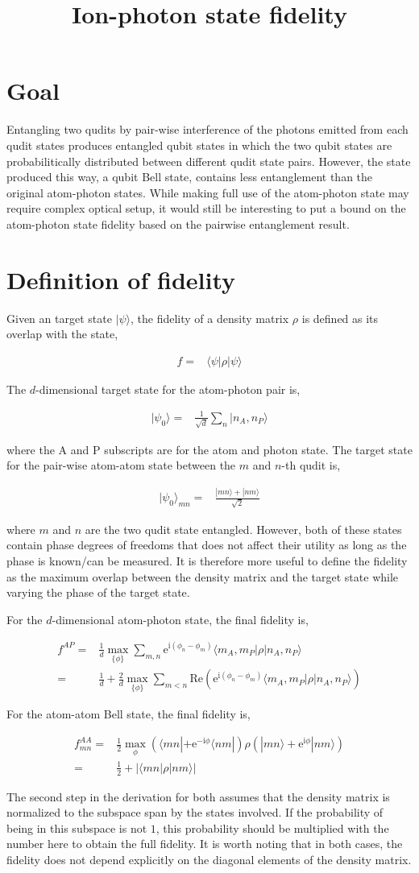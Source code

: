 \documentclass[10pt,fleqn]{article}
\title{Ion-photon state fidelity}
\newcommand{\ue}{\mathrm{e}}
\newcommand{\ui}{\mathrm{i}}
\newcommand{\eqar}[1]
{
  \begin{align}
    #1
  \end{align}
}
\newcommand{\paren}[1]{{\left({#1}\right)}}
\newcommand{\abs}[1]{{\left|{#1}\right|}}
\begin{document}
\maketitle

\section{Goal}

Entangling two qudits by pair-wise interference of the photons emitted from each qudit states produces entangled qubit states in which the two qubit states are probabilitically distributed between different qudit state pairs.
However, the state produced this way, a qubit Bell state, contains less entanglement than the original atom-photon states.
While making full use of the atom-photon state may require complex optical setup, it would still be interesting to put a bound on the atom-photon state fidelity based on the pairwise entanglement result.

\section{Definition of fidelity}
Given an target state $|\psi\rangle$, the fidelity of a density matrix $\rho$ is defined as its overlap with the state,
\eqar{
  f=&\langle\psi|\rho|\psi\rangle
}

The $d$-dimensional target state for the atom-photon pair is,
\eqar{
  |\psi_0\rangle=&\frac{1}{\sqrt{d}}\sum_{n}|n_A,n_P\rangle
}
where the A and P subscripts are for the atom and photon state. The target state for the pair-wise atom-atom state between the $m$ and $n$-th qudit is,
\eqar{
  |\psi_0\rangle_{mn}=&\frac{|mn\rangle+|nm\rangle}{\sqrt{2}}
}
where $m$ and $n$ are the two qudit state entangled.
However, both of these states contain phase degrees of freedoms that does not affect their utility as long as the phase is known/can be measured.
It is therefore more useful to define the fidelity as the maximum overlap between the density matrix and the target state while varying the phase of the target state.

For the $d$-dimensional atom-photon state, the final fidelity is,
\eqar{
  \label{eq:fid-ap}
  f^{AP}=&\frac{1}{d}\max_{\{\phi\}}\sum_{m,n}\ue^{\ui\paren{\phi_n-\phi_m}}\langle m_A,m_P|\rho|n_A,n_P\rangle\nonumber\\
  =&\frac{1}{d}+\frac{2}{d}\max_{\{\phi\}}\sum_{m<n}\mathrm{Re}\paren{\ue^{\ui\paren{\phi_n-\phi_m}}\langle m_A,m_P|\rho|n_A,n_P\rangle}
}
For the atom-atom Bell state, the final fidelity is,
\eqar{
  \label{eq:fid-aa}
  f^{AA}_{mn}=&\frac12\max_{\phi}\paren{\langle mn|+\ue^{-\ui\phi}\langle nm|}\rho\paren{|mn\rangle+\ue^{\ui\phi}|nm\rangle}\nonumber\\
  =&\frac12+\abs{\langle mn|\rho|nm\rangle}
}
The second step in the derivation for both assumes that the density matrix is normalized to the subspace span by the states involved.
If the probability of being in this subspace is not $1$, this probability should be multiplied with the number here to obtain the full fidelity.
It is worth noting that in both cases, the fidelity does not depend explicitly on the diagonal elements of the density matrix.
\end{document}

